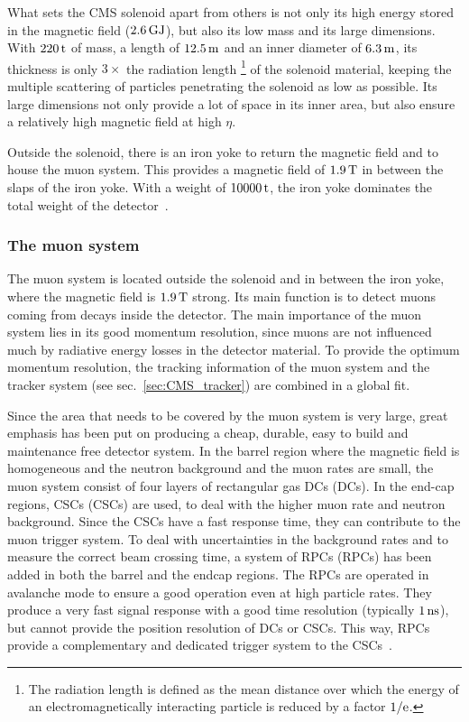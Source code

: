 What sets the \ac{CMS} solenoid apart from others is not only its high energy stored in the magnetic field ($2.6\,\rm{GJ}$), but also its low mass and its large dimensions. With $220\,\rm{t}$ of mass, a length of $12.5\,\rm{m}$ and an inner diameter of $6.3\,\rm{m}$, its thickness is only $3\times$ the radiation length \footnote{The radiation length is defined as the mean distance over which the energy of an electromagnetically interacting particle is reduced by a factor $1/\rm{e}$.} of the solenoid material, keeping the multiple scattering of particles penetrating the solenoid as low as possible. Its large dimensions not only provide a lot of space in its inner area, but also ensure a relatively high magnetic field at high $\eta$.

Outside the solenoid, there is an iron yoke to return the magnetic field and to house the muon system. This provides a magnetic field of $1.9\,\rm{T}$ in between the slaps of the iron yoke. With a weight of $10000\,\rm{t}$, the iron yoke dominates the total weight of the detector~\cite{C+08}.


\subsubsection{The muon system}
The muon system is located outside the solenoid and in between the iron yoke, where the magnetic field is $1.9\,\rm{T}$ strong. Its main function is to detect muons coming from decays inside the detector. The main importance of the muon system lies in its good momentum resolution, since muons are not influenced much by radiative energy losses in the detector material. To provide the optimum momentum resolution, the tracking information of the muon system and the tracker system (see sec.~\ref{sec:CMS_tracker}) are combined in a global fit.

Since the area that needs to be covered by the muon system is very large, great emphasis has been put on producing a cheap, durable, easy to build and maintenance free detector system. In the barrel region where the magnetic field is homogeneous and the neutron background and the muon rates are small, the muon system consist of four layers of rectangular gas \acl{DC}s (\acs{DC}s). In the end-cap regions, \ac{CSC}s (\acs{CSC}s) are used, to deal with the higher muon rate and neutron background. Since the \acs{CSC}s have a fast response time, they can contribute to the muon trigger system. To deal with uncertainties in the background rates and to measure the correct beam crossing time, a system of \acl{RPC}s (\acs{RPC}s) has been added in both the barrel and the endcap regions. The \acs{RPC}s are operated in avalanche mode to ensure a good operation even at high particle rates. They produce a very fast signal response with a good time resolution (typically $1\,\rm{ns}$), but cannot provide the position resolution of \acs{DC}s or \acs{CSC}s. This way, \acs{RPC}s provide a complementary and dedicated trigger system to the \acs{CSC}s~\cite{C+08}.



